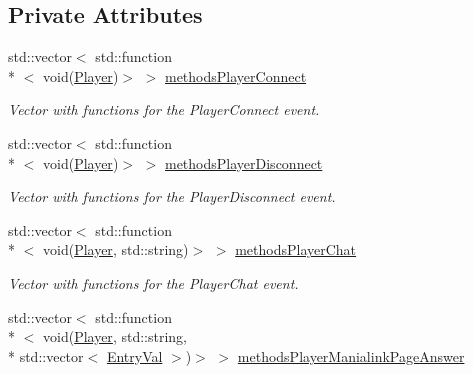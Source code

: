 \subsection*{Private Attributes}
\begin{DoxyCompactItemize}
\item 
\hypertarget{classEventManager_a98c39230b15f7d40fa5d3c87210a5fd9}{std\-::vector$<$ std\-::function\\*
$<$ void(\hyperlink{structPlayer}{Player})$>$ $>$ \hyperlink{classEventManager_a98c39230b15f7d40fa5d3c87210a5fd9}{methods\-Player\-Connect}}\label{classEventManager_a98c39230b15f7d40fa5d3c87210a5fd9}

\begin{DoxyCompactList}\small\item\em Vector with functions for the Player\-Connect event. \end{DoxyCompactList}\item 
\hypertarget{classEventManager_a05df9668a34f0dd3d4a9f049d884aea9}{std\-::vector$<$ std\-::function\\*
$<$ void(\hyperlink{structPlayer}{Player})$>$ $>$ \hyperlink{classEventManager_a05df9668a34f0dd3d4a9f049d884aea9}{methods\-Player\-Disconnect}}\label{classEventManager_a05df9668a34f0dd3d4a9f049d884aea9}

\begin{DoxyCompactList}\small\item\em Vector with functions for the Player\-Disconnect event. \end{DoxyCompactList}\item 
\hypertarget{classEventManager_ae2e1c22386c1ea3397d29cbcf3d2523d}{std\-::vector$<$ std\-::function\\*
$<$ void(\hyperlink{structPlayer}{Player}, std\-::string)$>$ $>$ \hyperlink{classEventManager_ae2e1c22386c1ea3397d29cbcf3d2523d}{methods\-Player\-Chat}}\label{classEventManager_ae2e1c22386c1ea3397d29cbcf3d2523d}

\begin{DoxyCompactList}\small\item\em Vector with functions for the Player\-Chat event. \end{DoxyCompactList}\item 
\hypertarget{classEventManager_a28d7fbe547c5177f293208ccf4f98fce}{std\-::vector$<$ std\-::function\\*
$<$ void(\hyperlink{structPlayer}{Player}, std\-::string, \\*
std\-::vector$<$ \hyperlink{structEntryVal}{Entry\-Val} $>$)$>$ $>$ \hyperlink{classEventManager_a28d7fbe547c5177f293208ccf4f98fce}{methods\-Player\-Manialink\-Page\-Answer}}\label{classEventManager_a28d7fbe547c5177f293208ccf4f98fce}


\end{DoxyCompactItemize}
